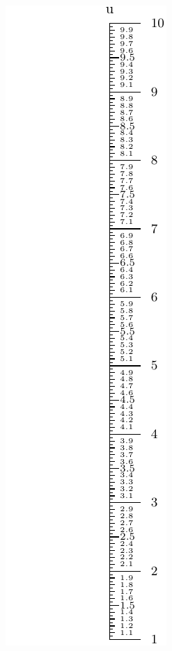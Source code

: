 \documentclass[a4paper,11pt,english]{sphinxmanual}
\begin{document}
\includegraphics{ex_axes_1.pdf}
\end{document}
